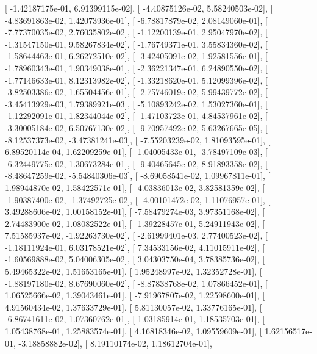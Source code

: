\documentclass{article}
\begin{document}
       [ -1.42187175e-01,   6.91399115e-02],
       [ -4.40875126e-02,   5.58240503e-02],
       [ -4.83691863e-02,   1.42073936e-01],
       [ -6.78817879e-02,   2.08149060e-01],
       [ -7.77370035e-02,   2.76035802e-02],
       [ -1.12200139e-01,   2.95047970e-02],
       [ -1.31547150e-01,   9.58267834e-02],
       [ -1.76749371e-01,   3.55834360e-02],
       [ -1.58644463e-01,   6.26272510e-02],
       [ -3.42405091e-02,   1.92581556e-01],
       [ -1.78960343e-01,   1.90349038e-01],
       [ -2.36221347e-01,   6.24890550e-02],
       [ -1.77146633e-01,   8.12313982e-02],
       [ -1.33218620e-01,   5.12099396e-02],
       [ -3.82503386e-02,   1.65504456e-01],
       [ -2.75746019e-02,   5.99439772e-02],
       [ -3.45413929e-03,   1.79389921e-03],
       [ -5.10893242e-02,   1.53027360e-01],
       [ -1.12292091e-01,   1.82344044e-02],
       [ -1.47103723e-01,   4.84537961e-02],
       [ -3.30005184e-02,   6.50767130e-02],
       [ -9.70957492e-02,   5.63267665e-05],
       [ -8.12537373e-02,  -3.47381241e-03],
       [ -7.55203239e-02,   1.81093595e-01],
       [  6.89520114e-04,   1.62209259e-01],
       [ -1.04005433e-01,  -3.78497109e-03],
       [ -6.32449775e-02,   1.30673284e-01],
       [ -9.40465645e-02,   8.91893358e-02],
       [ -8.48647259e-02,  -5.54840306e-03],
       [ -8.69058541e-02,   1.09967811e-01],
       [  1.98944870e-02,   1.58422571e-01],
       [ -4.03836013e-02,   3.82581359e-02],
       [ -1.90387400e-02,  -1.37492725e-02],
       [ -4.00101472e-02,   1.11076957e-01],
       [  3.49288606e-02,   1.00158152e-01],
       [ -7.58479274e-03,   3.97351168e-02],
       [  2.74483900e-02,   1.08082522e-01],
       [ -1.39228457e-01,   5.24911943e-02],
       [  7.51585937e-02,  -1.92263730e-02],
       [ -2.61999401e-03,   2.77400523e-02],
       [ -1.18111924e-01,   6.03178521e-02],
       [  7.34533156e-02,   4.11015911e-02],
       [ -1.60569888e-02,   5.04006305e-02],
       [  3.04303750e-04,   3.78385736e-02],
       [  5.49465322e-02,   1.51653165e-01],
       [  1.95248997e-02,   1.32352728e-01],
       [ -1.88197180e-02,   8.67690060e-02],
       [ -8.87838768e-02,   1.07866452e-01],
       [  1.06525666e-02,   1.39043461e-01],
       [ -7.91967807e-02,   1.22598600e-01],
       [  4.91560434e-02,   1.37633729e-01],
       [  5.81130057e-02,   1.33776165e-01],
       [ -6.86741611e-02,   1.07360762e-01],
       [  1.03185914e-01,   1.18535703e-01],
       [  1.05438768e-01,   1.25883574e-01],
       [  4.16818346e-02,   1.09559609e-01],
       [  1.62156517e-01,  -3.18858882e-02],
       [  8.19110174e-02,   1.18612704e-01],
\end{document}
